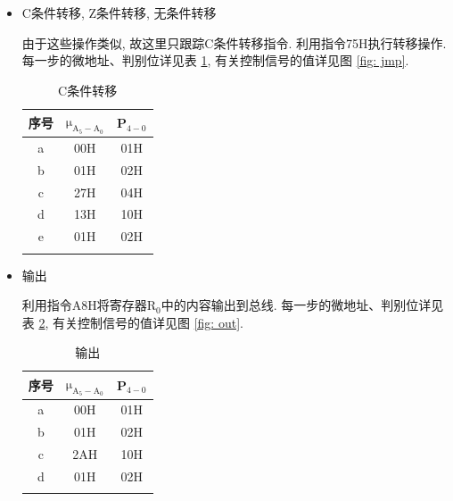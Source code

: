 \documentclass[../main.tex]{subfiles}
\begin{document}
\begin{enumerate}
\begin{itemize}
              \item C条件转移, Z条件转移, 无条件转移

                    由于这些操作类似, 故这里只跟踪C条件转移指令. 利用指令75H执行转移操作.
                    每一步的微地址、判别位详见表 \ref{tab: jmp}, 有关控制信号的值详见图 \ref{fig: jmp}.

                    \begin{table}[p]
                        \centering
                        \begin{tabular}{ccc}
                            \Xhline{1pt}
                            序号 & $\mathrm{\mu_{A_{5}-A_{0}}}$ & P$_{4-0}$ \\ \hline
                            a  & 00H                          & 01H       \\
                            b  & 01H                          & 02H       \\
                            c  & 27H                          & 04H       \\
                            d  & 13H                          & 10H       \\
                            e  & 01H                          & 02H       \\ \Xhline{1pt}
                        \end{tabular}
                        \caption{C条件转移}
                        \label{tab: jmp}
                    \end{table}

              \item 输出

                    利用指令A8H将寄存器R$_0$中的内容输出到总线.
                    每一步的微地址、判别位详见表 \ref{tab: out}, 有关控制信号的值详见图 \ref{fig: out}.

                    \begin{table}[p]
                        \centering
                        \begin{tabular}{ccc}
                            \Xhline{1pt}
                            序号 & $\mathrm{\mu_{A_{5}-A_{0}}}$ & P$_{4-0}$ \\ \hline
                            a  & 00H                          & 01H       \\
                            b  & 01H                          & 02H       \\
                            c  & 2AH                          & 10H       \\
                            d  & 01H                          & 02H       \\ \Xhline{1pt}
                        \end{tabular}
                        \caption{输出}
                        \label{tab: out}
                    \end{table}


\end{itemize}
\end{enumerate}
\end{document}
